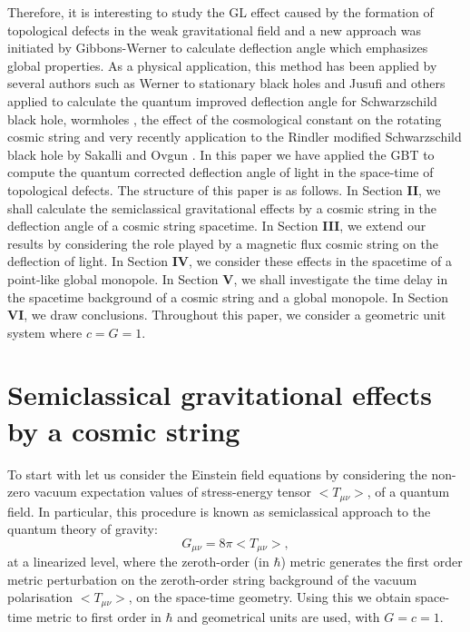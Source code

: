 \documentclass[preprint,superscriptaddress,amsfonts,amssymb,amsmath,showpacs]{revtex4}
\begin{document}
Therefore, it is interesting to study the GL effect caused by the formation of topological defects in the weak gravitational field and a new approach was initiated by Gibbons-Werner \cite{gibbons1} to calculate deflection angle which emphasizes global properties. As a physical application, this method has been applied by several authors such as Werner \cite{Werner} to stationary black holes and Jusufi and others applied to calculate the quantum improved deflection angle for Schwarzschild black hole, wormholes \cite{kimet1,kimet2,kimet3,kimet5},  the effect of the cosmological constant on the rotating cosmic string \cite{kimet6} and very recently application to the Rindler modified Schwarzschild black hole by Sakalli and Ovgun \cite{aovgun}.
In this paper we have applied the GBT to compute the quantum corrected deflection angle of light in the space-time of topological defects. The structure of this paper is as follows. In Section \textbf{II}, we shall calculate the semiclassical gravitational effects by a cosmic string in the deflection angle of a cosmic string spacetime. In Section \textbf{III}, we extend our results by considering the role played by a magnetic flux cosmic string on the deflection of light.  In Section \textbf{IV}, we consider these effects in the spacetime of a point-like global monopole. In Section \textbf{V}, we shall investigate the time delay in the spacetime background of a cosmic string and a global monopole. In Section \textbf{VI}, we draw conclusions. Throughout this paper, we consider a geometric unit system where $c = G = 1$.


\section{Semiclassical gravitational effects by a cosmic string}
To start with let us consider the Einstein field equations by 
considering the non-zero vacuum expectation values of stress-energy tensor $<T_{\mu\nu}>$,
of a quantum field. In particular, this procedure is known as semiclassical approach
to the quantum theory of gravity:
\begin{equation}
G_{\mu\nu}=8 \pi <T_{\mu\nu}>,
\end{equation}
at a linearized level, where the zeroth-order (in $\hbar$) metric generates 
the first order metric perturbation on the zeroth-order string background 
of the vacuum polarisation $ <T_{\mu\nu}>$,  on the space-time geometry.
Using this we obtain space-time metric to first order in $\hbar$ and geometrical units are used, with $G =c = 1$. 
\end{document}
